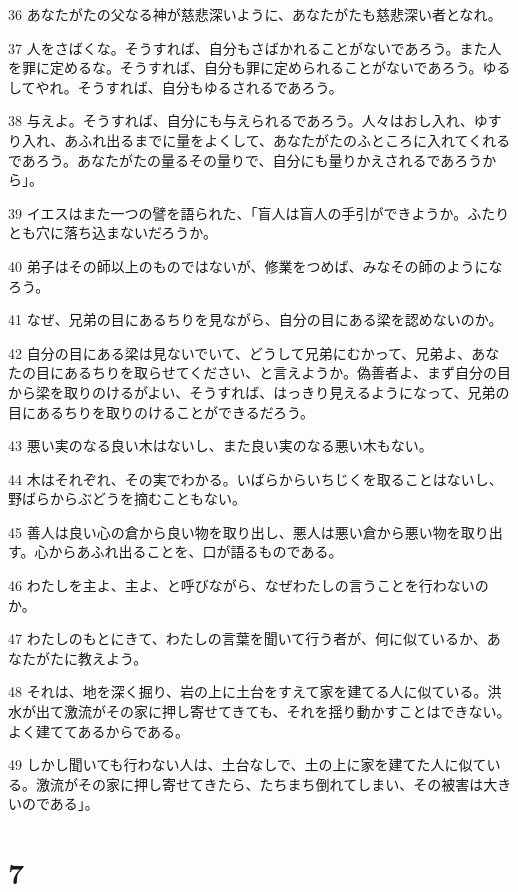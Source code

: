 \par 36 あなたがたの父なる神が慈悲深いように、あなたがたも慈悲深い者となれ。
\par 37 人をさばくな。そうすれば、自分もさばかれることがないであろう。また人を罪に定めるな。そうすれば、自分も罪に定められることがないであろう。ゆるしてやれ。そうすれば、自分もゆるされるであろう。
\par 38 与えよ。そうすれば、自分にも与えられるであろう。人々はおし入れ、ゆすり入れ、あふれ出るまでに量をよくして、あなたがたのふところに入れてくれるであろう。あなたがたの量るその量りで、自分にも量りかえされるであろうから」。
\par 39 イエスはまた一つの譬を語られた、「盲人は盲人の手引ができようか。ふたりとも穴に落ち込まないだろうか。
\par 40 弟子はその師以上のものではないが、修業をつめば、みなその師のようになろう。
\par 41 なぜ、兄弟の目にあるちりを見ながら、自分の目にある梁を認めないのか。
\par 42 自分の目にある梁は見ないでいて、どうして兄弟にむかって、兄弟よ、あなたの目にあるちりを取らせてください、と言えようか。偽善者よ、まず自分の目から梁を取りのけるがよい、そうすれば、はっきり見えるようになって、兄弟の目にあるちりを取りのけることができるだろう。
\par 43 悪い実のなる良い木はないし、また良い実のなる悪い木もない。
\par 44 木はそれぞれ、その実でわかる。いばらからいちじくを取ることはないし、野ばらからぶどうを摘むこともない。
\par 45 善人は良い心の倉から良い物を取り出し、悪人は悪い倉から悪い物を取り出す。心からあふれ出ることを、口が語るものである。
\par 46 わたしを主よ、主よ、と呼びながら、なぜわたしの言うことを行わないのか。
\par 47 わたしのもとにきて、わたしの言葉を聞いて行う者が、何に似ているか、あなたがたに教えよう。
\par 48 それは、地を深く掘り、岩の上に土台をすえて家を建てる人に似ている。洪水が出て激流がその家に押し寄せてきても、それを揺り動かすことはできない。よく建ててあるからである。
\par 49 しかし聞いても行わない人は、土台なしで、土の上に家を建てた人に似ている。激流がその家に押し寄せてきたら、たちまち倒れてしまい、その被害は大きいのである」。

\chapter{7}

